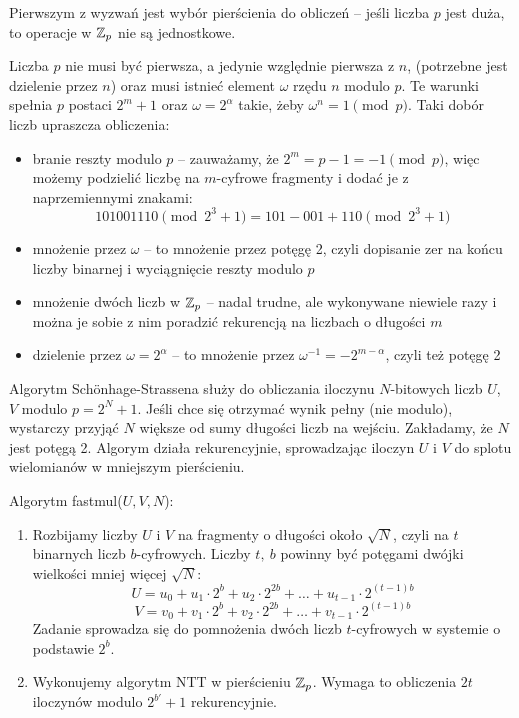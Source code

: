 Pierwszym z wyzwań jest wybór pierścienia do obliczeń -- jeśli liczba \( p \) jest duża, to operacje w \( \mathbb{Z}_p \) nie są jednostkowe.

Liczba \( p \) nie musi być pierwsza, a jedynie względnie pierwsza z \( n \), (potrzebne jest dzielenie przez \( n \)) oraz musi istnieć element \( \omega \) rzędu \( n \) modulo \( p \). Te warunki spełnia \( p \) postaci \( 2^m + 1 \) oraz \( \omega = 2^{\alpha} \) takie, żeby \( \omega^n = 1 \pmod{p} \). Taki dobór liczb upraszcza obliczenia:
\begin{itemize}
    \item branie reszty modulo \( p \) -- zauważamy, że \( 2^m = p - 1 = -1 \pmod{p} \), więc możemy podzielić liczbę na \( m \)-cyfrowe fragmenty i dodać je z naprzemiennymi znakami:
    \[
        101001110 \pmod{2^3 + 1} = 101 - 001 + 110 \pmod{2^3 + 1} 
    \]
    \item mnożenie przez \( \omega \) -- to mnożenie przez potęgę 2, czyli dopisanie zer na końcu liczby binarnej i wyciągnięcie reszty modulo \( p \)
    \item mnożenie dwóch liczb w \( \mathbb{Z}_p \) -- nadal trudne, ale wykonywane niewiele razy i można je  sobie z nim poradzić rekurencją na liczbach o długości \( m \)
    \item dzielenie przez \( \omega = 2^{\alpha} \) -- to mnożenie przez \( \omega^{-1} = -2^{m-\alpha} \), czyli też potęgę 2
\end{itemize}

Algorytm Sch{\"o}nhage-Strassena służy do obliczania iloczynu \( N \)-bitowych liczb \( U \), \( V \) modulo \( p = 2^N + 1 \).
Jeśli chce się otrzymać wynik pełny (nie modulo), wystarczy przyjąć \( N \) większe od sumy długości liczb na wejściu. Zakładamy, że \( N \) jest potęgą 2. Algorym działa rekurencyjnie, sprowadzając iloczyn \( U \) i \( V \) do splotu wielomianów w mniejszym pierścieniu.

\begin{greyframe}
    Algorytm fastmul(\( U, V, N \)):
    \begin{enumerate}
        \item Rozbijamy liczby \( U \) i \( V \) na fragmenty o długości około \( \sqrt{N} \), czyli na \( t \) binarnych liczb \( b \)-cyfrowych. Liczby \( t, \ b \) powinny być potęgami dwójki wielkości mniej więcej \( \sqrt{N} \):
        \[
            U = u_0 + u_1 \cdot 2^b + u_2 \cdot 2^{2b} + \ldots + u_{t-1} \cdot  2^{(t-1)b}
        \]
        \[
            V = v_0 + v_1 \cdot 2^b + v_2 \cdot 2^{2b} + \ldots + v_{t-1} \cdot 2^{(t-1)b}
        \]
        Zadanie sprowadza się do pomnożenia dwóch liczb \( t \)-cyfrowych w systemie o podstawie \( 2^b \).

        \item Wykonujemy algorytm NTT w pierścieniu \( \mathbb{Z}_p \). Wymaga to obliczenia \( 2t \) iloczynów modulo \( 2^{b'} + 1 \) rekurencyjnie.
    \end{enumerate}
\end{greyframe}

